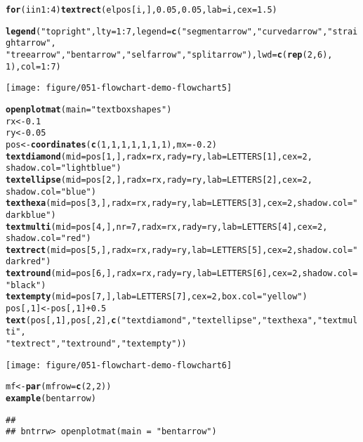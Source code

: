 \documentclass{article}\usepackage{graphicx, color}
\makeatletter
\def\maxwidth{ %
  \ifdim\Gin@nat@width>\linewidth
    \linewidth
  \else
    \Gin@nat@width
  \fi
}
\newcommand{\hlfunctioncall}[1]{\textcolor[rgb]{0.501960784313725,0,0.329411764705882}{\textbf{#1}}}%
\newcommand{\hlstring}[1]{\textcolor[rgb]{0.6,0.6,1}{#1}}%
\newenvironment{kframe}{%
 \def\at@end@of@kframe{}%
 \ifinner\ifhmode%
  \def\at@end@of@kframe{\end{minipage}}%
  \begin{minipage}{\columnwidth}%
 \fi\fi%
 \def\FrameCommand##1{\hskip\@totalleftmargin \hskip-\fboxsep
 \colorbox{shadecolor}{##1}\hskip-\fboxsep
     \hskip-\linewidth \hskip-\@totalleftmargin \hskip\columnwidth}%
 \MakeFramed {\advance\hsize-\width
   \@totalleftmargin\z@ \linewidth\hsize
   \@setminipage}}%
 {\par\unskip\endMakeFramed%
 \at@end@of@kframe}
\newenvironment{knitrout}{}{} %
\makeatother
\begin{document}
\begin{knitrout}
\begin{kframe}
\begin{alltt}
\hlfunctioncall{for} (i in 1:4) \hlfunctioncall{textrect}(elpos[i, ], 0.05, 0.05, lab = i, cex = 1.5)

\hlfunctioncall{legend}(\hlstring{"topright"}, lty = 1:7, legend = \hlfunctioncall{c}(\hlstring{"segmentarrow"}, \hlstring{"curvedarrow"}, \hlstring{"straightarrow"}, 
    \hlstring{"treearrow"}, \hlstring{"bentarrow"}, \hlstring{"selfarrow"}, \hlstring{"splitarrow"}), lwd = \hlfunctioncall{c}(\hlfunctioncall{rep}(2, 6), 
    1), col = 1:7)
\end{alltt}
\end{kframe}
\texttt{[image: figure/051-flowchart-demo-flowchart5]} 
\begin{kframe}\begin{alltt}

\hlfunctioncall{openplotmat}(main = \hlstring{"textbox shapes"})
rx <- 0.1
ry <- 0.05
pos <- \hlfunctioncall{coordinates}(\hlfunctioncall{c}(1, 1, 1, 1, 1, 1, 1), mx = -0.2)
\hlfunctioncall{textdiamond}(mid = pos[1, ], radx = rx, rady = ry, lab = LETTERS[1], cex = 2, 
    shadow.col = \hlstring{"lightblue"})
\hlfunctioncall{textellipse}(mid = pos[2, ], radx = rx, rady = ry, lab = LETTERS[2], cex = 2, 
    shadow.col = \hlstring{"blue"})
\hlfunctioncall{texthexa}(mid = pos[3, ], radx = rx, rady = ry, lab = LETTERS[3], cex = 2, shadow.col = \hlstring{"darkblue"})
\hlfunctioncall{textmulti}(mid = pos[4, ], nr = 7, radx = rx, rady = ry, lab = LETTERS[4], cex = 2, 
    shadow.col = \hlstring{"red"})
\hlfunctioncall{textrect}(mid = pos[5, ], radx = rx, rady = ry, lab = LETTERS[5], cex = 2, shadow.col = \hlstring{"darkred"})
\hlfunctioncall{textround}(mid = pos[6, ], radx = rx, rady = ry, lab = LETTERS[6], cex = 2, shadow.col = \hlstring{"black"})
\hlfunctioncall{textempty}(mid = pos[7, ], lab = LETTERS[7], cex = 2, box.col = \hlstring{"yellow"})
pos[, 1] <- pos[, 1] + 0.5
\hlfunctioncall{text}(pos[, 1], pos[, 2], \hlfunctioncall{c}(\hlstring{"textdiamond"}, \hlstring{"textellipse"}, \hlstring{"texthexa"}, \hlstring{"textmulti"}, 
    \hlstring{"textrect"}, \hlstring{"textround"}, \hlstring{"textempty"}))
\end{alltt}
\end{kframe}
\texttt{[image: figure/051-flowchart-demo-flowchart6]} 
\begin{kframe}\begin{alltt}


mf <- \hlfunctioncall{par}(mfrow = \hlfunctioncall{c}(2, 2))
\hlfunctioncall{example}(bentarrow)
\end{alltt}
\begin{verbatim}
## 
## bntrrw> openplotmat(main = "bentarrow")


\end{verbatim}
\end{kframe}
\end{knitrout}
\end{document}
